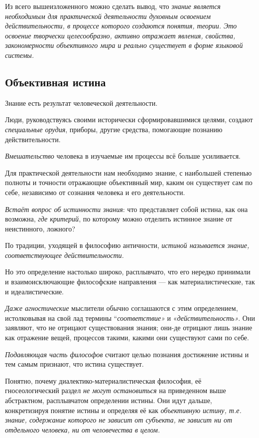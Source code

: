 \documentclass[a4paper,14pt,russian]{extreport}
\begin{document}
Из всего вышеизложенного можно сделать вывод, что \emph{знание является необходимым для практической деятельности духовным освоением действительности, в процессе которого создаются понятия, теории. Это освоение творчески целесообразно, активно отражает явления, свойства, закономерности объективного мира и реально существует в форме языковой системы.}

\subsection{Объективная истина}

Знание есть результат человеческой деятельности.

Люди, руководствуясь своими исторически сформировавшимися целями, создают \emph{специальные орудия}, приборы, другие средства, помогающие познанию действительности.

\emph{Вмешательство} человека в изучаемые им процессы всё больше усиливается.

Для практической деятельности нам необходимо знание, с наибольшей степенью полноты и точности отражающие объективный мир, каким он существует сам по себе, независимо от сознания человека и его деятельности.

\emph{Встаёт вопрос об истинности знания}: что представляет собой истина, как она возможна, \emph{где критерий}, по которому можно отделить истинное знание от неистинного, ложного?

По традиции, уходящей в философию античности, \emph{истиной называется знание, соответствующее действительности}.

Но это определение настолько широко, расплывчато, что его нередко принимали и взаимоисключающие философские направления --- как материалистические, так и идеалистические.

\emph{Даже агностические} мыслители обычно соглашаются с этим определением, истолковывая на свой лад термины ``\emph{соответствие»} и «\emph{действительность»}. Они заявляют, что не отрицают существования знания; они-де отрицают лишь знание как отражение вещей, процессов такими, какими они существуют сами по себе.

\emph{Подавляющая часть философов} считают целью познания достижение истины и тем самым признают, что истина существует.

Понятно, почему диалектико-материалистическая философия, её гносеологический раздел \emph{не могут остановиться} на приведенном выше абстрактном, расплывчатом определении истины. Они идут дальше, конкретизируя понятие истины и определяя её как \emph{объективную истину, т.е. знание, содержание которого не зависит от субъекта, не зависит ни от отдельного человека, ни от человечества в целом.}
\end{document}
